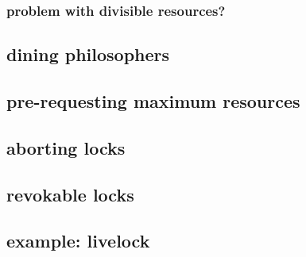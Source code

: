 

\subsubsection{problem with divisible resources?}


\subsection{dining philosophers}

\subsection{pre-requesting maximum resources}



\subsection{aborting locks}



\subsection{revokable locks}



\subsection{example: livelock}






